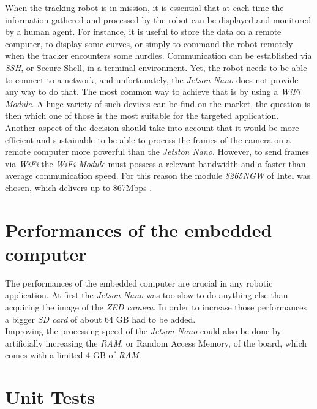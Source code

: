 		When the tracking robot is in mission, it is essential that 
		at each time the information gathered and processed by the
		robot can be displayed and monitored by a human agent.
		For instance, it is useful to store the data on a remote 
		computer, to display some curves, or 
		simply to command the robot remotely when the tracker encounters
		some hurdles. Communication can be established via \textit{SSH}, or Secure Shell,
		in a terminal environment. Yet, the robot needs to be able 
		to connect to a network, and unfortunately, the 
		\textit{Jetson Nano} does not provide any way to do that. The most common way 
		to achieve that is by using a \textit{WiFi Module}. A huge 
		variety of such devices can be find on the market, the question 
		is then which one of those is the most suitable for the 
		targeted application.
		\\\indent Another aspect of the decision should take into 
		account that it would be more efficient and sustainable 
		to be able to process the frames of the camera on
		a remote computer more powerful than the \textit{Jetston Nano}.
		However, to send frames via \textit{WiFi} the \textit{ WiFi Module}
		must possess a relevant bandwidth and a faster than average communication
		speed. For this reason the module \textit{8265NGW} of Intel was chosen, which 
		delivers up to 867Mbps \cite{wifi}.
		
	\section{Performances of the embedded computer}
	
		The performances of the embedded computer are crucial in 
		any robotic application.
		At first the \textit{Jetson Nano} was too slow 
		to do anything else than acquiring the image of the \textit{ZED camera}.
		In order to increase those performances a bigger \textit{SD card} of 
		about 64 GB had to be added.
		\\\indent Improving the processing speed of the \textit{Jetson Nano}
		could also be done by artificially increasing the \textit{RAM}, or Random Access
		Memory, of the board, which comes with a limited 4 GB of \textit{RAM}. \cite{swap}
	
	\section{Unit Tests}

